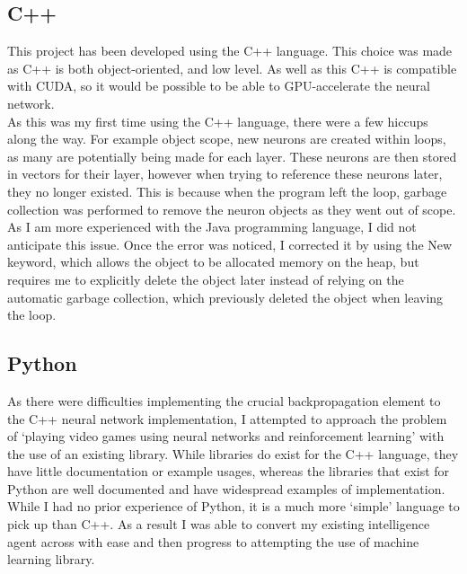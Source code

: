 \documentclass[10pt]{article}
\begin{document}
	\medskip
	
	\subsection{C++}
		This project has been developed using the C++ language. This choice was made as C++ is both object-oriented, and low level. As well as this C++ is compatible with CUDA, so it would be possible to be able to GPU-accelerate the neural network.\\
		
		As this was my first time using the C++ language, there were a few hiccups along the way. For example object scope, new neurons are created within loops, as many are potentially being made for each layer. These neurons are then stored in vectors for their layer, however when trying to reference these neurons later, they no longer existed. This is because when the program left the loop, garbage collection was performed to remove the neuron objects as they went out of scope.\\
		
		As I am more experienced with the Java programming language, I did not anticipate this issue. Once the error was noticed, I corrected it by using the New keyword, which allows the object to be allocated memory on the heap, but requires me to explicitly delete the object later instead of relying on the automatic garbage collection, which previously deleted the object when leaving the loop.
	
	\medskip
	
	\subsection{Python}
		As there were difficulties implementing the crucial backpropagation element to the C++ neural network implementation, I attempted to approach the problem of `playing video games using neural networks and reinforcement learning' with the use of an existing library. While libraries do exist for the C++ language, they have little documentation or example usages, whereas the libraries that exist for Python are well documented and have widespread examples of implementation.\\
		
		While I had no prior experience of Python, it is a much more `simple' language to pick up than C++. As a result I was able to convert my existing intelligence agent across with ease and then progress to attempting the use of machine learning library.
	
\end{document}
